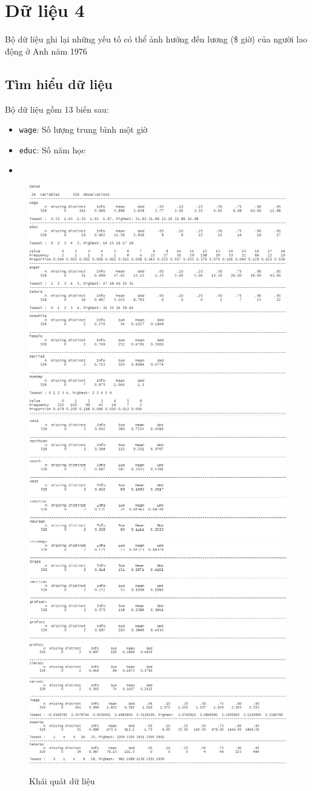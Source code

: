 
\section{Dữ liệu 4}
Bộ dữ liệu ghi lại những yếu tố có thể ảnh hưởng đến lương (\$ giờ) của người lao động ở Anh năm 1976

\subsection*{Tìm hiểu dữ liệu}
Bộ dữ liệu gồm 13 biến sau:
\begin{itemize}
	\item \texttt{wage}: Số lượng trung bình một giờ
	\item \texttt{educ}: Số năm học
	\item 
\end{itemize}


\begin{figure}
	\centering
	{\includegraphics[width=0.63\linewidth]{../Photo Of Result/describe(4)-1}}
	{\includegraphics[width=0.63\linewidth]{../Photo Of Result/describe(4)-2}}
	{\includegraphics[width=0.63\linewidth]{../Photo Of Result/describe(4)-3}}
	\caption{Khái quát dữ liệu}
	\label{describe-4}
\end{figure}

